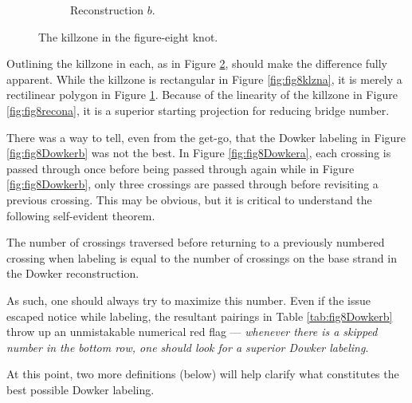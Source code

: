 \documentclass[titlepage]{article}
\begin{document}
\begin{figure}[h!]
\begin{subfigure}[b]{0.4\linewidth}
        \caption{Reconstruction $b$.}
        \label{fig:fig8klznb}
    \end{subfigure}
    \caption{The killzone in the figure-eight knot.}
    \label{fig:fig8klzn}
\end{figure}

Outlining the killzone in each, as in Figure \ref{fig:fig8klzn}, should make the difference fully apparent. While the killzone is rectangular in Figure \ref{fig:fig8klzna}, it is merely a rectilinear polygon in Figure \ref{fig:fig8klznb}. Because of the linearity of the killzone in Figure \ref{fig:fig8recona}, it is a superior starting projection for reducing bridge number.\par
There was a way to tell, even from the get-go, that the Dowker labeling in Figure \ref{fig:fig8Dowkerb} was not the best. In Figure \ref{fig:fig8Dowkera}, each crossing is passed through once before being passed through again while in Figure \ref{fig:fig8Dowkerb}, only three crossings are passed through before revisiting a previous crossing. This may be obvious, but it is critical to understand the following self-evident theorem.

\begin{theor}
    The number of crossings traversed before returning to a previously numbered crossing when labeling is equal to the number of crossings on the base strand in the Dowker reconstruction.
\end{theor}

As such, one should always try to maximize this number. Even if the issue escaped notice while labeling, the resultant pairings in Table \ref{tab:fig8Dowkerb} throw up an unmistakable numerical red flag --- \emph{whenever there is a skipped number in the bottom row, one should look for a superior Dowker labeling}.\par
At this point, two more definitions (below) will help clarify what constitutes the best possible Dowker labeling.
\end{document}
